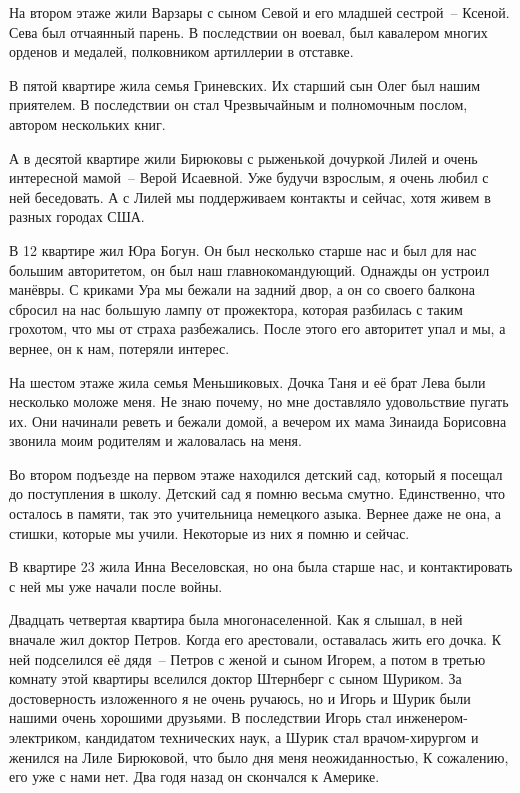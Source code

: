 На втором этаже жили Варзары с сыном Севой и его младшей сестрой~-- Ксеной. Сева был отчаянный парень.
В последствии он воевал, был кавалером многих орденов и медалей, полковником артиллерии в отставке.

В пятой квартире жила семья Гриневских. Их старший сын Олег был нашим приятелем. В последствии он стал Чрезвычайным и полномочным послом, автором нескольких книг.

А в десятой квартире жили Бирюковы с рыженькой дочуркой Лилей и очень интересной мамой~-- Верой Исаевной. Уже будучи взрослым, я очень любил с ней беседовать. А с Лилей мы поддерживаем контакты и сейчас, хотя живем в разных городах США.

В 12 квартире жил Юра Богун. Он был несколько старше нас и был для нас большим авторитетом, он был наш главнокомандующий. Однажды он устроил манёвры. С криками Ура мы бежали на задний двор, а он со своего балкона сбросил на нас большую лампу от прожектора, которая разбилась с таким грохотом, что мы от страха разбежались. После этого его авторитет упал и мы, а вернее, он к нам, потеряли интерес.

На шестом этаже жила семья Меньшиковых. Дочка Таня и её брат Лева были несколько моложе меня. Не знаю почему, но мне доставляло удовольствие пугать их. Они начинали реветь и бежали домой, а вечером их мама Зинаида Борисовна звонила моим родителям и жаловалась на меня.

Во втором подъезде на первом этаже находился детский сад, который я посещал до поступления в школу.
Детский сад я помню весьма смутно. Единственно, что осталось в памяти, так это учительница немецкого азыка. Вернее даже не  она, а стишки, которые мы учили. Некоторые из них я помню и сейчас.

В квартире 23 жила Инна Веселовская, но она была старше нас, и  контактировать с ней мы уже начали после войны.

Двадцать четвертая квартира была многонаселенной. Как я слышал, в ней вначале жил доктор Петров. Когда его арестовали, оставалась жить его дочка. К ней подселился её дядя~-- Петров с женой и сыном Игорем, а потом в третью комнату этой квартиры вселился доктор Штернберг с сыном Шуриком. За достоверность изложенного я не очень ручаюсь, но и Игорь и Шурик были нашими очень хорошими друзьями. В последствии Игорь стал инженером-электриком, кандидатом технических наук, а Шурик стал врачом-хирургом и женился на Лиле Бирюковой, что было дня меня неожиданностью, К сожалению, его уже с нами нет. Два годя назад он скончался к Америке.

